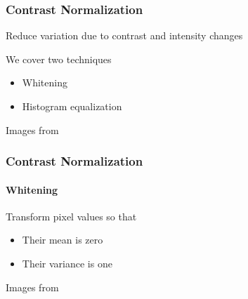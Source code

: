 \documentclass[xetex,professionalfont]{beamer}
\begin{document}

\begin{frame}
\frametitle{Contrast Normalization}

Reduce variation due to contrast and intensity changes

\bigskip
We cover two techniques
\begin{itemize}
	\item Whitening
	\item Histogram equalization
\end{itemize}

\medskip
\begin{center}
	{\centering Images from \cite{prince12}}
\end{center}

\end{frame}


\begin{frame}
\frametitle{Contrast Normalization}
\framesubtitle{Whitening}

Transform pixel values so that
\begin{itemize}
	\item Their mean is zero
	\item Their variance is one %
\end{itemize}

\medskip
\begin{center}
	{\centering Images from \cite{prince12}}
\end{center}

\end{frame}
\end{document}
